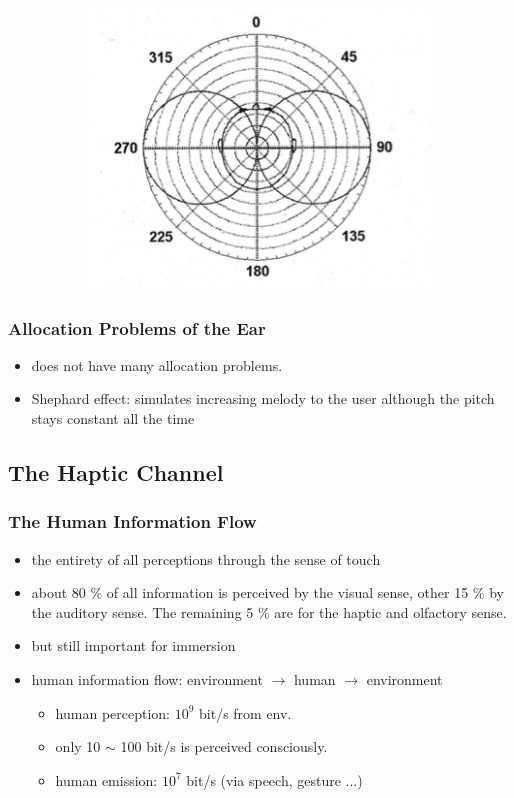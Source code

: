 \documentclass{standalone}
\begin{document}
\begin{itemize}
\begin{figure}[H]
\begin{subfigure}[b]{0.45\textwidth}
		\end{subfigure}
		\begin{subfigure}[b]{0.45\textwidth}
			\includegraphics[width = 0.7\linewidth]{Figures/2_68.png}
		\end{subfigure}
		\end{figure}
\end{itemize}

\setcounter{subsubsection}{3}
\subsubsection{Allocation Problems of the Ear}

\begin{itemize}
	\item does not have many allocation problems. 
	\item Shephard effect: simulates increasing melody to the user although the pitch stays constant all the time
\end{itemize}

\subsection{The Haptic Channel}
\subsubsection{The Human Information Flow}
\begin{itemize}
	\item the entirety of all perceptions through the sense of touch
	\item about 80 \% of all information is perceived by the visual sense, other 15 \% by the auditory sense. The remaining 5 \% are for the haptic and olfactory sense. 
	\item but still important for immersion
	\item human information flow: environment $\rightarrow$ human $\rightarrow$ environment
		\begin{itemize}
			\item human perception: $10^9$ bit/s from env.
			\item only 10 $\sim$ 100 bit/s is perceived consciously. 
			\item human emission: $10^7$ bit/s (via speech, gesture ...)
		\end{itemize}
\end{itemize}
\end{document}

